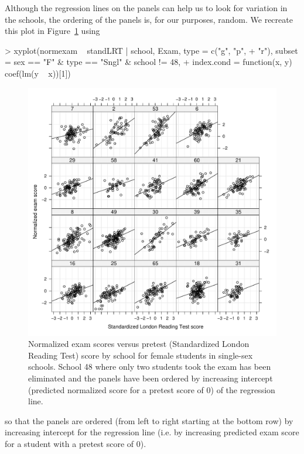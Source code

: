 \documentclass[12pt]{article}
\begin{document}
Although the regression lines on the panels can help us to look for
variation in the schools, the ordering of the panels is, for our
purposes, random.  We recreate this plot in Figure~\ref{fig:Examplot4} using
\begin{Schunk}
\begin{Sinput}
> xyplot(normexam ~ standLRT | school, Exam, type = c("g", "p", 
+     "r"), subset = sex == "F" & type == "Sngl" & school != 48, 
+     index.cond = function(x, y) coef(lm(y ~ x))[1])
\end{Sinput}
\end{Schunk}
\begin{figure}[tbp]
  \centering
  \includegraphics[width=\textwidth]{figs/SoftRev-Examplot4}
  \caption{Normalized exam scores versus pretest (Standardized London
    Reading Test) score by school for female students in single-sex
    schools. School 48 where only two students took the exam has been
    eliminated and the panels have been ordered by increasing
    intercept (predicted normalized score for a pretest score of 0) of
    the regression line.}
  \label{fig:Examplot4}
\end{figure}
so that the panels are ordered (from left to right starting at the
bottom row) by increasing intercept for the regression line (i.e.{} by
increasing predicted exam score for a student with a pretest score of 0).
\end{document}
